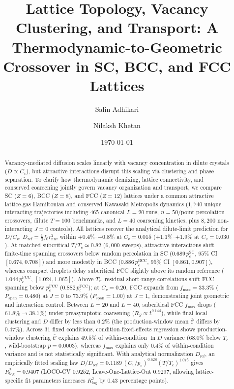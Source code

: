 \documentclass[aps,pre,reprint,superscriptaddress,amsmath,amssymb,floatfix]{revtex4-2}
\begin{document}
\title{Lattice Topology, Vacancy Clustering, and Transport: A Thermodynamic-to-Geometric Crossover in SC, BCC, and FCC Lattices}

\author{Salin Adhikari}

\author{Nilaksh Khetan}

\date{\today}

\begin{abstract}
Vacancy-mediated diffusion scales linearly with vacancy concentration in dilute crystals ($D \propto C_v$), but attractive interactions disrupt this scaling via clustering and phase separation. To clarify how thermodynamic demixing, lattice connectivity, and conserved coarsening jointly govern vacancy organization and transport, we compare SC ($Z=6$), BCC ($Z=8$), and FCC ($Z=12$) lattices under a common attractive lattice-gas Hamiltonian and conserved Kawasaki Metropolis dynamics ($1{,}740$ unique interacting trajectories including $465$ canonical $L=20$ runs, $n=50$/point percolation crossovers, dilute $T=100$ benchmarks, and $L=40$ coarsening kinetics, plus $8{,}200$ non-interacting $J=0$ controls). All lattices recover the analytical dilute-limit prediction for $D/C_v$, $D_{\mathrm{ref}} = \frac{1}{3}f_0 r_{\mathrm{nn}}^2$, within $+0.4\%$--$+0.8\%$ at $C_v=0.015$ ($+1.1\%$--$+1.9\%$ at $C_v=0.030$). At matched subcritical $T/T_c \simeq 0.82$ ($6{,}000$ sweeps), attractive interactions shift finite-time spanning crossovers below random percolation in SC ($0.689\,p_c^{\mathrm{SC}}$, $95\%$ CI $[0.674,0.708]$) and more modestly in BCC ($0.886\,p_c^{\mathrm{BCC}}$, $95\%$ CI $[0.861,0.907]$), whereas compact droplets delay subcritical FCC slightly above its random reference ($1.044\,p_c^{\mathrm{FCC}}$, $[1.024,1.065]$). Above $T_c$, residual short-range correlations shift FCC spanning below $p_c^{\mathrm{FCC}}$ ($0.882\,p_c^{\mathrm{FCC}}$); at $C_v=0.20$, FCC expands from $f_{\max}=33.3\%$ ($P_{\mathrm{span}}=0.480$) at $J=0$ to $73.9\%$ ($P_{\mathrm{span}}=1.00$) at $J=1$, demonstrating joint geometric and interaction control. Between $L=20$ and $L=40$, subcritical FCC $f_{\max}$ drops ($61.8\% \to 38.7\%$) under preasymptotic coarsening ($R_S \propto t^{0.144}$), while final local clustering and $D$ differ by less than $0.2\%$ (the production-window mean $\bar{\mathcal{C}}$ differs by $0.47\%$). Across $31$ fixed conditions, condition-fixed-effects regression shows production-window clustering $\bar{\mathcal{C}}$ explains $49.5\%$ of within-condition $\ln D$ variance ($68.0\%$ below $T_c$, wild-bootstrap $p=0.0003$), whereas $f_{\max}$ explains only $0.4\%$ of within-condition variance and is not statistically significant. With analytical normalization $D_{\mathrm{ref}}$, an empirically fitted scaling law $D/D_{\mathrm{ref}} = 0.1189\,(C_v/p_c)^{0.628}(T/T_c)^{1.075}$ gives $R^2_{\log}=0.9407$ (LOCO-CV $0.9252$, Leave-One-Lattice-Out $0.9297$, allowing lattice-specific fit parameters increases $R^2_{\log}$ by $0.43$ percentage points).
\end{abstract}
\end{document}
